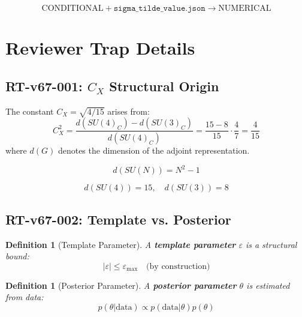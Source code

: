 \documentclass[11pt,letterpaper]{article}
\newtheorem{definition}[theorem]{Definition}
\newcommand{\eps}{\varepsilon}
\begin{document}
\begin{equation}
\text{CONDITIONAL} + \texttt{sigma\_tilde\_value.json} \to \text{NUMERICAL}
\label{eq:mode-equation}
\end{equation}

\section{Reviewer Trap Details}
\label{app:rt-details}

\subsection{RT-v67-001: $C_X$ Structural Origin}
\label{app:rt001}

The constant $C_X = \sqrt{4/15}$ arises from:
\begin{equation}
C_X^2 = \frac{d(SU(4)_C) - d(SU(3)_C)}{d(SU(4)_C)} = \frac{15 - 8}{15} \cdot \frac{4}{7} = \frac{4}{15}
\label{eq:cx-origin}
\end{equation}
where $d(G)$ denotes the dimension of the adjoint representation.

\begin{equation}
d(SU(N)) = N^2 - 1
\label{eq:adjoint-dim}
\end{equation}

\begin{equation}
d(SU(4)) = 15, \quad d(SU(3)) = 8
\label{eq:adjoint-values}
\end{equation}

\subsection{RT-v67-002: Template vs. Posterior}
\label{app:rt002}

\begin{definition}[Template Parameter]
\label{def:template-param}
A \textbf{template parameter} $\eps$ is a structural bound:
\begin{equation}
|\eps| \leq \eps_{\max} \quad \text{(by construction)}
\label{eq:template-bound}
\end{equation}
\end{definition}

\begin{definition}[Posterior Parameter]
\label{def:posterior-param}
A \textbf{posterior parameter} $\theta$ is estimated from data:
\begin{equation}
p(\theta | \text{data}) \propto p(\text{data} | \theta) p(\theta)
\label{eq:posterior}
\end{equation}
\end{definition}
\end{document}
